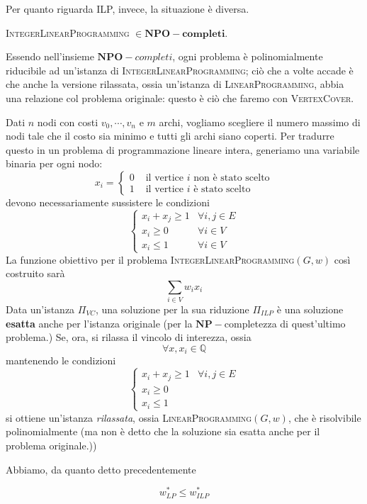 Per quanto riguarda ILP, invece, la situazione è diversa.
\begin{theorem}\label{thm:IntegerLinearProgramming_NPOc}
	\textsc{IntegerLinearProgramming} $\in \mathbf{NPO-completi}$.
\end{theorem}

\noindent
Essendo nell'insieme $\mathbf{NPO}-completi$, ogni problema è polinomialmente riducibile
ad un'istanza di \textsc{IntegerLinearProgramming}; ciò che a volte accade è
che anche la versione rilassata, ossia un'istanza di \textsc{LinearProgramming},
abbia una relazione col problema originale: questo è ciò che faremo con
\textsc{VertexCover}.

Dati $n$ nodi con costi $v_0, \cdots, v_n$ e $m$ archi, vogliamo scegliere
il numero massimo di nodi tale che il costo sia minimo e tutti gli archi
siano coperti. Per tradurre questo in un problema di programmazione lineare
intera, generiamo una variabile binaria per ogni nodo:
$$
	x_i = \begin{cases} 0 & \text{ il vertice } i \text{ non è stato scelto} \\
              1 & \text{ il vertice } i \text{ è stato scelto}\end{cases}
$$
devono necessariamente sussistere le condizioni
$$
	\begin{cases}
		x_i + x_j \geq 1 & \forall i, j \in E \\
		x_i \geq 0       & \forall i \in V    \\
		x_i \leq 1       & \forall i \in V
	\end{cases}
$$
La funzione obiettivo per il problema \textsc{IntegerLinearProgramming}$(G,w)$
così costruito sarà
$$
	\sum_{i \in V} w_i x_i
$$
Data un'istanza $\Pi_{VC}$, una soluzione per la sua riduzione $\Pi_{ILP}$ è
una soluzione \textbf{esatta} anche per l'istanza originale (per la $\mathbf{NP}-$completezza
di quest'ultimo problema.)
Se, ora, si rilassa il vincolo di interezza, ossia
$$
	\forall x, x_i \in \mathbb{Q}
$$
mantenendo le condizioni
$$
	\begin{cases}
		x_i + x_j \geq 1 & \forall i, j \in E \\
		x_i \geq 0                            \\
		x_i \leq 1
	\end{cases}
$$
si ottiene  un'istanza \textit{rilassata}, ossia \textsc{LinearProgramming}$(G,w)$,
che è risolvibile polinomialmente (ma non è detto che la soluzione sia
esatta anche per il problema originale.))

Abbiamo, da quanto detto precedentemente
\begin{lemma}\label{lem:lp_leq_ilp}
	$$
		w^*_{LP} \leq w^*_{ILP}
	$$
\end{lemma}

